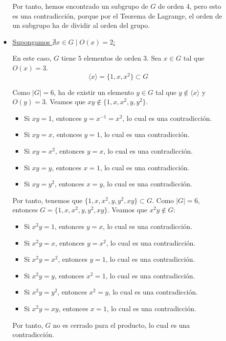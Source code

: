 \begin{ejercicio}
\begin{enumerate}
\begin{itemize}
\begin{itemize}
                Por tanto, hemos encontrado un subgrupo de $G$ de orden 4, pero esto es una contradicción, porque por el Teorema de Lagrange, el orden de un subgrupo ha de dividir al orden del grupo.

                \item \ul{Supongamos $\nexists x\in G\mid O(x)=2$:}
                
                En este caso, $G$ tiene $5$ elementos de orden 3. Sea $x\in G$ tal que $O(x)=3$.
                \begin{equation*}
                    \langle x\rangle = \{1,x,x^2\}\subset G
                \end{equation*}

                Como $|G|=6$, ha de existir un elemento $y\in G$ tal que $y\notin\langle x\rangle$ y $O(y)=3$. Veamos que $xy\notin \{1,x,x^2, y, y^2\}$.
                \begin{itemize}
                    \item Si $xy=1$, entonces $y=x^{-1}=x^2$, lo cual es una contradicción.
                    \item Si $xy=x$, entonces $y=1$, lo cual es una contradicción.
                    \item Si $xy=x^2$, entonces $y=x$, lo cual es una contradicción.
                    \item Si $xy=y$, entonces $x=1$, lo cual es una contradicción.
                    \item Si $xy=y^2$, entonces $x=y$, lo cual es una contradicción.
                \end{itemize}

                Por tanto, tenemos que $\{1,x,x^2,y,y^2,xy\}\subset G$. Como $|G|=6$, entonces $G=\{1,x,x^2,y,y^2,xy\}$. Veamos que $x^2y\notin G$:
                \begin{itemize}
                    \item Si $x^2y=1$, entonces $y=x$, lo cual es una contradicción.
                    \item Si $x^2y=x$, entonces $y=x^2$, lo cual es una contradicción.
                    \item Si $x^2y=x^2$, entonces $y=1$, lo cual es una contradicción.
                    \item Si $x^2y=y$, entonces $x^2=1$, lo cual es una contradicción.
                    \item Si $x^2y=y^2$, entonces $x^2=y$, lo cual es una contradicción.
                    \item Si $x^2y=xy$, entonces $x=1$, lo cual es una contradicción.
                \end{itemize}
                Por tanto, $G$ no es cerrado para el producto, lo cual es una contradicción.


\end{itemize}
\end{itemize}
\end{enumerate}
\end{ejercicio}
